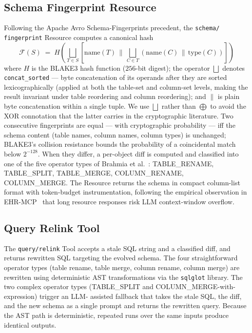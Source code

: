 \documentclass[conference,10pt,a4paper]{IEEEtran}
\begin{document}
\subsection{Schema Fingerprint Resource}
Following the Apache Avro Schema-Fingerprints precedent, the
\texttt{schema/} \texttt{fingerprint} Resource computes a canonical hash
\begin{equation}
\mathcal{F}(S) \;=\; H\!\left( \bigsqcup_{T \in S}\!\!\left[ \text{name}(T)
\,\|\, \bigsqcup_{C \in T}\!\!\left( \text{name}(C) \,\|\, \text{type}(C)
\right) \right] \right)
\label{eq:fp}
\end{equation}
where $H$ is the BLAKE3 hash function ($256$-bit digest); the operator
$\bigsqcup$ denotes \texttt{concat\_sorted} --- byte concatenation of
its operands after they are sorted lexicographically (applied at both
the table-set and column-set levels, making the result invariant under
table reordering and column reordering); and $\|$ is plain byte
concatenation within a single tuple. We use $\bigsqcup$ rather than
$\bigoplus$ to avoid the XOR connotation that the latter carries in
the cryptographic literature. Two consecutive
fingerprints are equal --- with cryptographic probability --- iff the
schema content (table names, column names, column types) is unchanged; BLAKE3's collision resistance bounds the
probability of a coincidental match below $2^{-128}$. When they
differ, a per-object diff is computed and classified into one of the five
operator types of Brahmia et al.~\cite{brahmia2024schemaevol}: TABLE\_RENAME,
TABLE\_SPLIT, TABLE\_MERGE, COLUMN\_RENAME, COLUMN\_MERGE. The Resource
returns the schema in compact column-list format with token-budget
instrumentation, following the empirical observation in
EHR-MCP~\cite{masayoshi2025ehrmcp} that long resource responses risk LLM
context-window overflow.

\subsection{Query Relink Tool}
The \texttt{query/relink} Tool accepts a stale SQL string and a classified
diff, and returns rewritten SQL targeting the evolved schema. The four
straightforward operator types (table rename, table merge, column rename,
column merge) are rewritten using deterministic AST transformations via the
\texttt{sqlglot} library. The two complex operator types
(TABLE\_SPLIT and COLUMN\_MERGE-with-expression) trigger an LLM-
assisted fallback that takes the stale SQL,
the diff, and the new schema as a single prompt and returns the rewritten
query. Because the AST path is deterministic, repeated runs over the same
inputs produce identical outputs.
\end{document}
